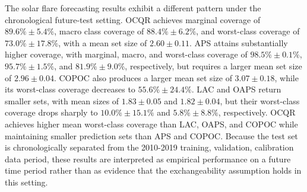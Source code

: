 \documentclass[conference]{IEEEtran}
\begin{document}
The solar flare forecasting results exhibit a different pattern under the chronological future-test setting. OCQR achieves marginal coverage of \(89.6\%\pm5.4\%\), macro class coverage of \(88.4\%\pm6.2\%\), and worst-class coverage of \(73.0\%\pm17.8\%\), with a mean set size of \(2.60\pm0.11\). APS attains substantially higher coverage, with marginal, macro, and worst-class coverage of \(98.5\%\pm0.1\%\), \(95.7\%\pm1.5\%\), and \(81.9\%\pm9.0\%\), respectively, but requires a larger mean set size of \(2.96\pm0.04\). COPOC also produces a larger mean set size of \(3.07\pm0.18\), while its worst-class coverage decreases to \(55.6\%\pm24.4\%\). LAC and OAPS return smaller sets, with mean sizes of \(1.83\pm0.05\) and \(1.82\pm0.04\), but their worst-class coverage drops sharply to \(10.0\%\pm15.1\%\) and \(5.8\%\pm8.8\%\), respectively. OCQR achieves higher mean worst-class coverage than LAC, OAPS, and COPOC while maintaining smaller prediction sets than APS and COPOC. Because the test set is chronologically separated from the 2010-2019 training, validation, calibration data period, these results are interpreted as empirical performance on a future time period rather than as evidence that the exchangeability assumption holds in this setting.
\end{document}
